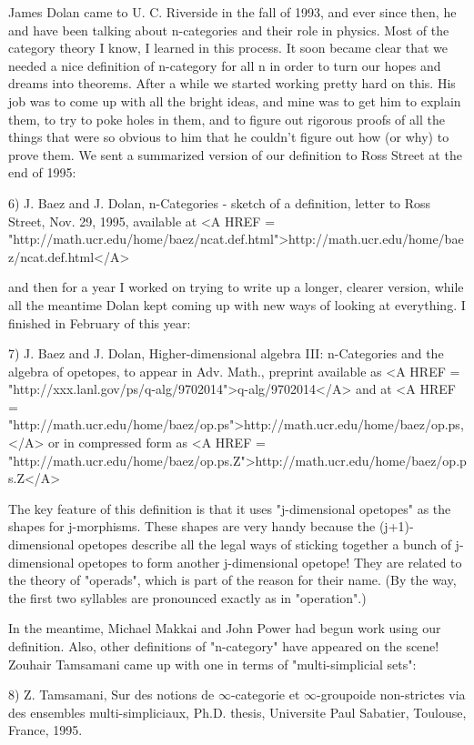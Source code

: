 James Dolan came to U. C. Riverside in the fall of 1993, and ever
since then, he and have been talking about n-categories and their role
in physics.  Most of the category theory I know, I learned in this
process.  It soon became clear that we needed a nice definition of
n-category for all n in order to turn our hopes and dreams into
theorems.  After a while we started working pretty hard on this.  His
job was to come up with all the bright ideas, and mine was to get him
to explain them, to try to poke holes in them, and to figure out
rigorous proofs of all the things that were so obvious to him that he
couldn't figure out how (or why) to prove them.  We sent a summarized
version of our definition to Ross Street at the end of 1995:

6) J. Baez and J. Dolan, n-Categories - sketch of a definition,
letter to Ross Street, Nov. 29, 1995, available at
<A HREF = "http://math.ucr.edu/home/baez/ncat.def.html">http://math.ucr.edu/home/baez/ncat.def.html</A>

and then for a year I worked on trying to write up a longer, clearer
version, while all the meantime Dolan kept coming up with new ways of
looking at everything.  I finished in February of this year:

7) J. Baez and J. Dolan, Higher-dimensional algebra III: n-Categories
and the algebra of opetopes, to appear in Adv. Math., preprint
available as <A HREF =
"http://xxx.lanl.gov/ps/q-alg/9702014">q-alg/9702014</A> and at <A HREF
=
"http://math.ucr.edu/home/baez/op.ps">http://math.ucr.edu/home/baez/op.ps,</A>
or in compressed form as <A HREF = "http://math.ucr.edu/home/baez/op.ps.Z">http://math.ucr.edu/home/baez/op.ps.Z</A>

The key feature of this definition is that it uses "j-dimensional
opetopes" as the shapes for j-morphisms.  These shapes are very handy
because the (j+1)-dimensional opetopes describe all the legal ways of
sticking together a bunch of j-dimensional opetopes to form another
j-dimensional opetope!  They are related to the theory of "operads",
which is part of the reason for their name.  (By the way, the first
two syllables are pronounced exactly as in "operation".)

In the meantime, Michael Makkai and John Power had begun work using
our definition.  Also, other definitions of "n-category" have appeared
on the scene!  Zouhair Tamsamani came up with one in terms of
"multi-simplicial sets":

8) Z. Tamsamani, Sur des notions de $\infty$-categorie et
$\infty$-groupoide non-strictes via des ensembles multi-simpliciaux,
Ph.D. thesis, Universite Paul Sabatier, Toulouse, France, 1995.

